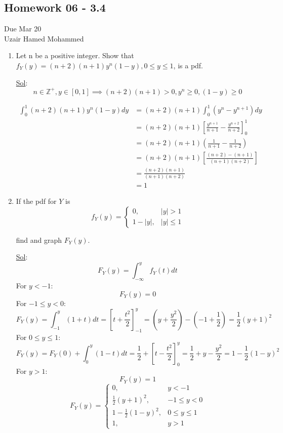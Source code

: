 \begin{center}
  \section*{Homework 06 - 3.4}
  Due Mar 20 \\
  Uzair Hamed Mohammed
\end{center}


\begin{enumerate}
  \item[6.] Let n be a positive integer. Show that \(f_Y(y) = (n + 2)
    (n + 1) y^n (1 - y), 0 \leq y \leq 1\), is a pdf.

    \underline{Sol}:\\

    \[
      n \in \mathbb{Z}^+, y \in [0, 1] \implies (n + 2) (n + 1) > 0,
      y^n \ge 0, (1 - y) \ge 0
    \]

    \[
      \begin{aligned}
        \int_{0}^{1} (n+2)(n+1)y^n(1-y) dy &= (n+2)(n+1) \int_{0}^{1}
        (y^n - y^{n+1}) dy \\
        &= (n+2)(n+1) \left[ \frac{y^{n+1}}{n+1} -
        \frac{y^{n+2}}{n+2} \right]_0^1 \\
        &= (n+2)(n+1) \left( \frac{1}{n+1} - \frac{1}{n+2} \right) \\
        &= (n+2)(n+1) \left[ \frac{(n+2) - (n+1)}{(n+1)(n+2)} \right] \\
        &= \frac{(n+2)(n+1)}{(n+1)(n+2)} \\
        &= 1
      \end{aligned}
    \]

  \item[9.] If the pdf for \(Y\) is
    \begin{equation*}
      f_Y(y) =
      \begin{cases}
        0, & |y| > 1 \\
        1 - |y|, & |y| \leq 1
      \end{cases}
    \end{equation*}

    find and graph \(F_Y(y)\).

    \underline{Sol}:\\

    $$F_Y(y) = \int_{-\infty}^y f_Y(t) dt$$
    For \(y < -1\):
    \[F_Y(y) = 0\]
    For \(-1 \le y < 0\):
    \[F_Y(y) = \int_{-1}^y (1+t) dt = \left[ t + \frac{t^2}{2}
      \right]_{-1}^y = (y + \frac{y^2}{2}) - (-1 + \frac{1}{2}) =
    \frac{1}{2}(y+1)^2\]
    For \(0 \le y \le 1\):
    \[F_Y(y) = F_Y(0) + \int_0^y (1-t) dt = \frac{1}{2} + \left[ t -
      \frac{t^2}{2} \right]_0^y = \frac{1}{2} + y - \frac{y^2}{2} = 1 -
    \frac{1}{2}(1-y)^2\]
    For \(y > 1\):
    \[F_Y(y) = 1\]
    \[F_Y(y) =
      \begin{cases} 0, & y < -1 \\ \frac{1}{2}(y+1)^2, & -1 \le y < 0
        \\ 1 - \frac{1}{2}(1-y)^2, & 0 \le y \le 1 \\ 1, & y > 1
    \end{cases}\]


\end{enumerate}
